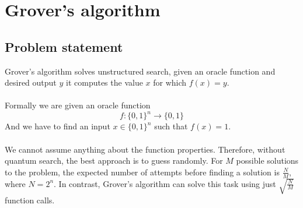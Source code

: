 \section{Grover's algorithm}
\subsection{Problem statement}
Grover's algorithm solves unstructured search, given an oracle function and desired output $y$ it computes the value $x$ for which $f(x)=y$. \\\\
Formally we are given an oracle function 
$$f:\{0,1\}^n\rightarrow \{0,1\}$$
And we have to find an input $x\in \{0,1\}^n$ such that $f(x)=1$. \\\\
We cannot assume anything about the function properties. Therefore, without quantum search, the best approach is to guess randomly. For $M$ possible solutions to the problem, the expected number of attempts before finding a solution is $\frac{N}{M}$, where $N=2^n$. In contrast, Grover's algorithm can solve this task using just $\sqrt{\frac{N}{M}}$ function calls. \\\\
